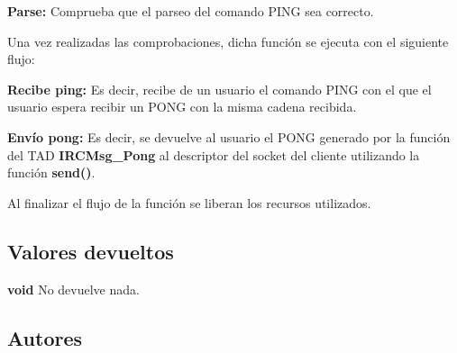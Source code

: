 \begin{DoxyItemize}
\item {\bfseries Parse\+:} Comprueba que el parseo del comando P\+I\+N\+G sea correcto. 
\end{DoxyItemize}

Una vez realizadas las comprobaciones, dicha función se ejecuta con el siguiente flujo\+:


\begin{DoxyItemize}
\item {\bfseries Recibe ping\+:} Es decir, recibe de un usuario el comando P\+I\+N\+G con el que el usuario espera recibir un P\+O\+N\+G con la misma cadena recibida.  
\item {\bfseries Envío pong\+:} Es decir, se devuelve al usuario el P\+O\+N\+G generado por la función del T\+A\+D {\bfseries I\+R\+C\+Msg\+\_\+\+Pong} al descriptor del socket del cliente utilizando la función {\bfseries send()}. 
\end{DoxyItemize}

Al finalizar el flujo de la función se liberan los recursos utilizados.\hypertarget{server_command_ping_return_ping}{}\subsection{Valores devueltos}\label{server_command_ping_return_ping}

\begin{DoxyItemize}
\item {\bfseries void} No devuelve nada. 
\end{DoxyItemize}\hypertarget{server_command_ping_authors_ping}{}\subsection{Autores}\label{server_command_ping_authors_ping}

